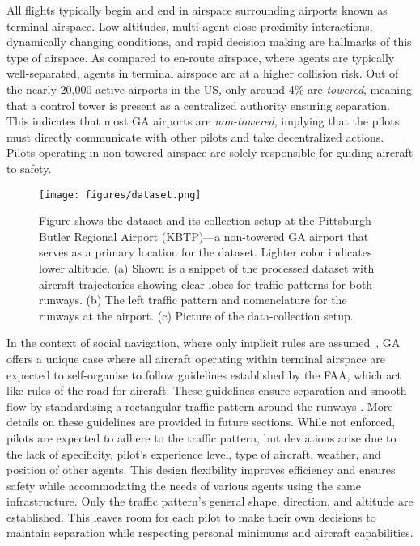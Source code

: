 \documentclass[letterpaper, 10 pt, conference]{ieeeconf}
\begin{document}
All flights typically begin and end in airspace surrounding airports known as terminal airspace. Low altitudes, multi-agent close-proximity interactions, dynamically changing conditions, and rapid decision making are hallmarks of this type of airspace. As compared to en-route airspace, where agents are typically well-separated, agents in terminal airspace are at a higher collision risk. Out of the nearly 20,000 active airports \cite{johnson2017estimating} in the US, only around 4\% are \textit{towered}, meaning that a control tower is present as a centralized authority ensuring separation. This indicates that most GA airports are \textit{non-towered}, implying that the pilots must directly communicate with other pilots and take decentralized actions. 
Pilots operating in non-towered airspace are solely responsible for guiding aircraft to safety. 
\begin{figure*}[!hbt]
    \centering
        \texttt{[image: figures/dataset.png]}
    \caption{Figure shows the dataset and its collection setup at the Pittsburgh-Butler Regional Airport (KBTP)---a non-towered GA airport that serves as a primary location for the dataset. Lighter color indicates lower altitude. (a) Shown is a snippet of the processed dataset with aircraft trajectories showing clear lobes for traffic patterns for both runways. (b) The left traffic pattern and nomenclature for the runways at the airport. (c) Picture of the data-collection setup.}
    \label{kbtp}
\end{figure*}

In the context of social navigation, where only implicit rules are assumed~\cite{mavrogiannis2021core}, GA offers a unique case where all aircraft operating within terminal airspace are expected to self-organise to follow guidelines established by the FAA, which act like rules-of-the-road for aircraft. These guidelines ensure separation and smooth flow by standardising a rectangular traffic pattern around the runways \cite{federal-aviation-administration-2018B}. More details on these guidelines are provided in future sections. While not enforced, pilots are expected to adhere to the traffic pattern, but deviations arise due to the lack of specificity, pilot's experience level, type of aircraft, weather, and position of other agents. This design flexibility improves efficiency and ensures safety while accommodating the needs of various agents using the same infrastructure. Only the traffic pattern's general shape, direction, and altitude are established. This leaves room for each pilot to make their own decisions to maintain separation while respecting personal minimums and aircraft capabilities. 
\end{document}
